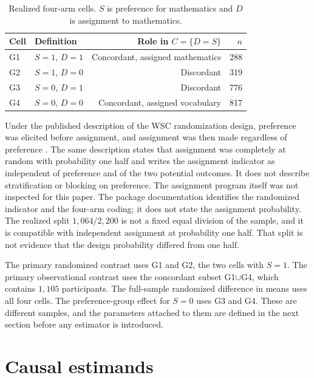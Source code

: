 \documentclass[11pt]{article}
\theoremstyle{remark}
\begin{document}
\begin{table}[t]
\centering
\caption{Realized four-arm cells. $S$ is preference for mathematics and $D$ is assignment to mathematics.}
\label{tab:cells}
\begin{tabular}{llrr}
\toprule
Cell & Definition & Role in $C=\{D=S\}$ & $n$ \\
\midrule
G1 & $S=1$, $D=1$ & Concordant, assigned mathematics & 288 \\
G2 & $S=1$, $D=0$ & Discordant & 319 \\
G3 & $S=0$, $D=1$ & Discordant & 776 \\
G4 & $S=0$, $D=0$ & Concordant, assigned vocabulary & 817 \\
\bottomrule
\end{tabular}
\end{table}

Under the published description of the WSC randomization design, preference was elicited before assignment, and assignment was then made regardless of preference \citep{keller2025}. The same description states that assignment was completely at random with probability one half and writes the assignment indicator as independent of preference and of the two potential outcomes. It does not describe stratification or blocking on preference. The assignment program itself was not inspected for this paper. The package documentation identifies the randomized indicator and the four-arm coding; it does not state the assignment probability. The realized split $1{,}064/2{,}200$ is not a fixed equal division of the sample, and it is compatible with independent assignment at probability one half. That split is not evidence that the design probability differed from one half.

The primary randomized contrast uses G1 and G2, the two cells with $S=1$. The primary observational contrast uses the concordant subset G1$\cup$G4, which contains $1{,}105$ participants. The full-sample randomized difference in means uses all four cells. The preference-group effect for $S=0$ uses G3 and G4. These are different samples, and the parameters attached to them are defined in the next section before any estimator is introduced.

\section{Causal estimands}
\label{sec:theory}
\end{document}
